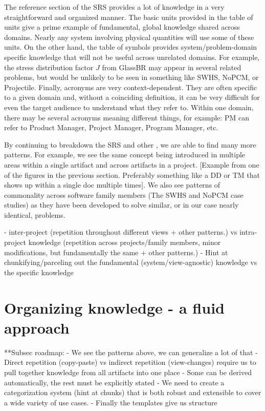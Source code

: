 The reference section of the SRS provides a lot of knowledge in a very 
straightforward and organized manner. The basic units provided in the table of 
units give a prime example of fundamental, global knowledge shared across 
domains. Nearly any system involving physical quantities will use some of these 
units. On the other hand, the table of symbols provides system/problem-domain 
specific knowledge that will not be useful across unrelated domains. For 
example, the stress distribution factor $J$ from GlassBR may appear in several 
related problems, but would be unlikely to be seen in something like SWHS, 
NoPCM, or Projectile. Finally, acronyms are very context-dependent. They are 
often specific to a given domain and, without a coinciding definition, it can 
be very difficult for even the target audience to understand what they refer 
to. Within one domain, there may be several acronyms meaning different things, 
for example: PM can refer to Product Manager, Project Manager, Program 
Manager, etc.

By continuing to breakdown the SRS and other \sfs{}, we are able to find many 
more patterns. For example, we see the same concept being introduced in 
multiple areas within a single artifact and across artifacts in a project. 
[Example from one of the figures in the previous section. Preferably something 
like a DD or TM that shows up within a single doc multiple times]. We also see 
patterns of commonality across software family members (The SWHS and NoPCM case 
studies) as they have been developed to solve similar, or in our case nearly 
identical, problems.

- inter-project (repetition throughout different views + other patterns.)
  vs intra-project knowledge (repetition across projects/family members,
  minor modifications, but fundamentally the same + other patterns.)
- Hint at chunkifying/parceling out the fundamental (system/view-agnostic)
knowledge vs the specific knowledge


\section{Organizing knowledge - a fluid approach}
  **Subsec roadmap:
    - We see the patterns above, we can generalize a lot of that
    - Direct repetition (copy-paste) vs indirect repetition (view-changes)
    require us to pull together knowledge from all artifacts into one place
    - Some can be derived automatically, the rest must be explicitly stated
    - We need to create a categorization system (hint at chunks) that is both
    robust and extensible to cover a wide variety of use cases.
    - Finally the templates give us structure

